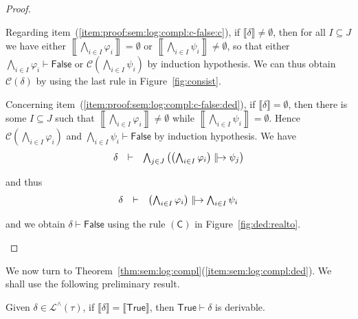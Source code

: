 \documentclass[%
  a4paper,
  UKenglish,
  cleveref,
  autoref,
  thm-restate,
  numberwithinsect,
]{lipics-v2021}
\newcommand\sle\subseteq
\newcommand\thesis{\vdash}
\newcommand\I[1]{\llbracket #1 \rrbracket} %
\newcommand\BigI[1]{\left\llbracket #1 \right\rrbracket} %
\newcommand\ax[1]{(\mathsf{#1})}
\newcommand\C{\mathcal{C}}		%
\newcommand\temp[1]{\mathsf{#1}}
\newcommand\True{\temp{True}}
\newcommand\False{\temp{False}}
\newcommand\defrealto{\mathrel\parallel\joinrel\to}
\newcommand\realto{\mathrel{\defrealto}}
\newcommand\PT{\tau}		%
\newcommand\Lang{\mathcal{L}}
\begin{document}
\begin{proof}
\begin{description}
Regarding item~(\ref{item:proof:sem:log:compl:c-false:c}),
if $\I\delta \neq \emptyset$,
then for all $I \sle J$ we have either
$\BigI{\bigwedge_{i \in I} \varphi_i} = \emptyset$
or
$\BigI{\bigwedge_{i \in I} \psi_i} \neq \emptyset$,
so that either
$\bigwedge_{i \in I} \varphi_i \thesis \False$
or
$\C(\bigwedge_{i \in I} \psi_i)$
by induction hypothesis.
We can thus obtain $\C(\delta)$ by using the last rule in
Figure~\ref{fig:consist}.

Concerning item~(\ref{item:proof:sem:log:compl:c-false:ded}),
if $\I\delta = \emptyset$,
then there is some $I \sle J$
such that
$\BigI{\bigwedge_{i \in I} \varphi_i} \neq \emptyset$
while
$\BigI{\bigwedge_{i \in I} \psi_i} = \emptyset$.
Hence
$\C(\bigwedge_{i \in I} \varphi_i)$
and
$\bigwedge_{i \in I} \psi_i \thesis \False$
by induction hypothesis.
%
We have
\[
\begin{array}{l l l}
  \delta
& \thesis
& \bigwedge_{j \in J}
  \left(
  \left( \bigwedge_{i \in I} \varphi_i \right)
  \realto
  \psi_j
  \right)
\end{array}
\]

\noindent
and thus
\[
\begin{array}{l l l}
  \delta
& \thesis
& \left( \bigwedge_{i \in I} \varphi_i \right)
  \realto
  \bigwedge_{i \in I} \psi_i
\end{array}
\]

\noindent
and we obtain $\delta \thesis \False$ using the rule $\ax{C}$
in Figure~\ref{fig:ded:realto}.
\qedhere
\end{description}
\end{proof}

We now turn to Theorem~\ref{thm:sem:log:compl}(\ref{item:sem:log:compl:ded}).
We shall use the following preliminary result.

\begin{lemma}
\label{lem:proof:sem:log:compl:true}
Given $\delta \in \Lang^\land(\PT)$,
if $\I\delta = \I\True$,
then $\True \thesis \delta$ is derivable.
\end{lemma}
\end{document}
